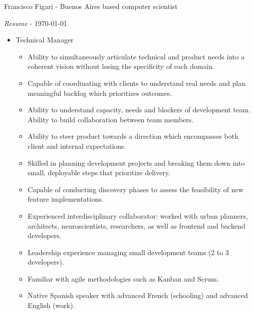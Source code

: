\documentclass[a4paper]{article}
\begin{document}
\thispagestyle{empty}

Francisco Figari - Buenos Aires based computer scientist

\textit{Resume} - \monthyeardate\today

\begin{itemize}

  \item Technical Manager
  \begin{itemize}
    \item Ability to simultaneously articulate technical and product needs into a coherent vision without losing the specificity of each domain.
    \item Capable of coordinating with clients to understand real needs and plan meaningful backlog which prioritizes outcomes.
    \item Ability to understand capacity, needs and blockers of development team. Ability to build collaboration between team members.
    \item Ability to steer product towards a direction which encompasses both client and internal expectations.
    \item Skilled in planning development projects and breaking them down into small, deployable steps that prioritize delivery.
    \item Capable of conducting discovery phases to assess the feasibility of new feature implementations.
    \item Experienced interdisciplinary collaborator: worked with urban planners, architects, neuroscientists, researchers, as well as frontend and backend developers.
    \item Leadership experience managing small development teams (2 to 3 developers).
    \item Familiar with agile methodologies such as Kanban and Scrum.
    \item Native Spanish speaker with advanced French (schooling) and advanced English (work).
  \end{itemize}


\end{itemize}
\end{document}
